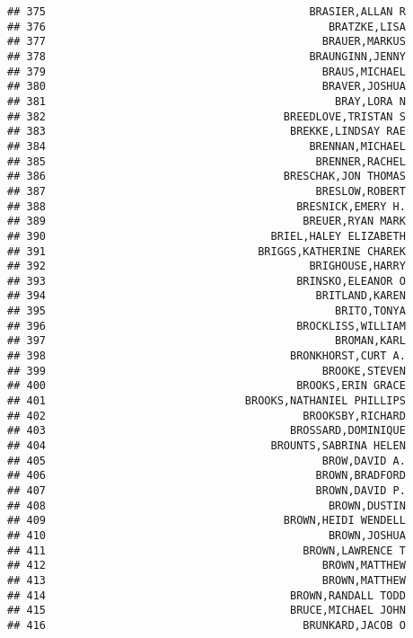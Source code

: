 \documentclass[
]{article}
\begin{document}
\begin{verbatim}
## 375                                         BRASIER,ALLAN R
## 376                                            BRATZKE,LISA
## 377                                           BRAUER,MARKUS
## 378                                         BRAUNGINN,JENNY
## 379                                           BRAUS,MICHAEL
## 380                                           BRAVER,JOSHUA
## 381                                             BRAY,LORA N
## 382                                     BREEDLOVE,TRISTAN S
## 383                                      BREKKE,LINDSAY RAE
## 384                                         BRENNAN,MICHAEL
## 385                                          BRENNER,RACHEL
## 386                                     BRESCHAK,JON THOMAS
## 387                                          BRESLOW,ROBERT
## 388                                       BRESNICK,EMERY H.
## 389                                        BREUER,RYAN MARK
## 390                                   BRIEL,HALEY ELIZABETH
## 391                                 BRIGGS,KATHERINE CHAREK
## 392                                         BRIGHOUSE,HARRY
## 393                                       BRINSKO,ELEANOR O
## 394                                          BRITLAND,KAREN
## 395                                             BRITO,TONYA
## 396                                       BROCKLISS,WILLIAM
## 397                                             BROMAN,KARL
## 398                                      BRONKHORST,CURT A.
## 399                                           BROOKE,STEVEN
## 400                                       BROOKS,ERIN GRACE
## 401                               BROOKS,NATHANIEL PHILLIPS
## 402                                        BROOKSBY,RICHARD
## 403                                      BROSSARD,DOMINIQUE
## 404                                   BROUNTS,SABRINA HELEN
## 405                                           BROW,DAVID A.
## 406                                          BROWN,BRADFORD
## 407                                          BROWN,DAVID P.
## 408                                            BROWN,DUSTIN
## 409                                     BROWN,HEIDI WENDELL
## 410                                            BROWN,JOSHUA
## 411                                        BROWN,LAWRENCE T
## 412                                           BROWN,MATTHEW
## 413                                           BROWN,MATTHEW
## 414                                      BROWN,RANDALL TODD
## 415                                      BRUCE,MICHAEL JOHN
## 416                                        BRUNKARD,JACOB O

\end{verbatim}
\end{document}
